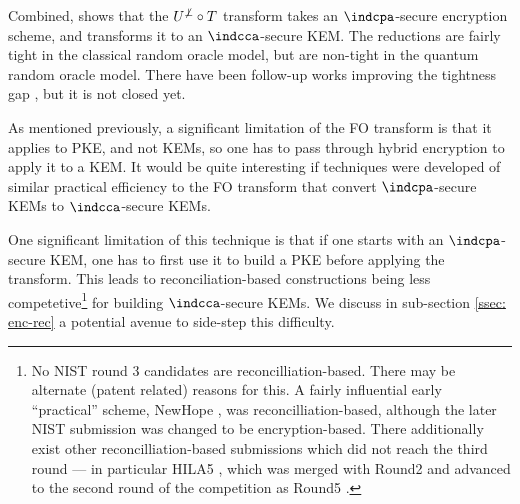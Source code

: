 Combined, \cite{TCC:HofHovKil17} shows that the $U^{\not\bot}\circ T$ transform takes an $\indcpa$-secure encryption scheme, and transforms it to an $\indcca$-secure KEM.
The reductions are fairly tight in the classical random oracle model, but are non-tight in the quantum random oracle model.
There have been follow-up works improving the tightness gap \cite{C:JZCWM18,EPRINT:JiaZhaMa19b}, but it is not closed yet.

As mentioned previously, a significant limitation of the FO transform is that it applies to PKE, and not KEMs, so one has to pass through hybrid encryption to apply it to a KEM.
It would be quite interesting if techniques were developed of similar practical efficiency to the FO transform that convert $\indcpa$-secure KEMs to $\indcca$-secure KEMs.

One significant limitation of this technique is that if one starts with an $\indcpa$-secure KEM, one has to first use it to build a PKE before applying the transform. This leads to reconciliation-based constructions being less competetive\footnote{No NIST round 3 candidates are reconcilliation-based. There may be alternate (patent related) reasons for this. A fairly influential early ``practical'' scheme, NewHope \cite{USENIX:ADPS16}, was reconcilliation-based, although the later NIST submission \cite{EPRINT:ADPS16} was changed to be encryption-based.
	There additionally exist other reconcilliation-based submissions which did not reach the third round --- in particular HILA5 \cite{SAC:Saarinen17}, which was merged with Round2 \cite{EPRINT:BBGRTT17} and advanced to the second round of the competition as Round5 \cite{EPRINT:BGLRST18}.} for building $\indcca$-secure KEMs.
We discuss in sub-section \ref{ssec: enc-rec} a potential avenue to side-step this difficulty.